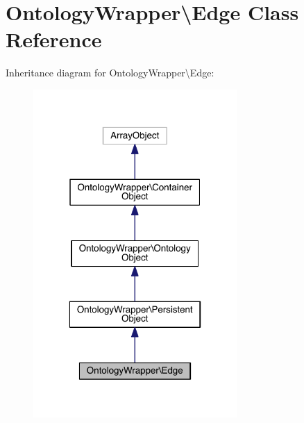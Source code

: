 \hypertarget{class_ontology_wrapper_1_1_edge}{\section{Ontology\-Wrapper\textbackslash{}Edge Class Reference}
\label{class_ontology_wrapper_1_1_edge}
}


Inheritance diagram for Ontology\-Wrapper\textbackslash{}Edge\-:
\nopagebreak
\begin{figure}[H]
\begin{center}
\leavevmode
\includegraphics[width=220pt]{class_ontology_wrapper_1_1_edge__inherit__graph}
\end{center}
\end{figure}


